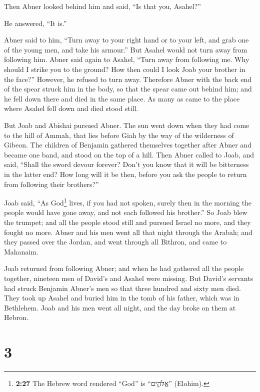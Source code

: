  Then Abner looked behind him and said, ``Is that you,
Asahel?''

He answered, ``It is.''

 Abner said to him, ``Turn away to your right hand or to
your left, and grab one of the young men, and take his armour.'' But
Asahel would not turn away from following him.  Abner
said again to Asahel, ``Turn away from following me. Why should I strike
you to the ground? How then could I look Joab your brother in the
face?''  However, he refused to turn away. Therefore
Abner with the back end of the spear struck him in the body, so that the
spear came out behind him; and he fell down there and died in the same
place. As many as came to the place where Asahel fell down and died
stood still.

 But Joab and Abishai pursued Abner. The sun went down
when they had come to the hill of Ammah, that lies before Giah by the
way of the wilderness of Gibeon.  The children of
Benjamin gathered themselves together after Abner and became one band,
and stood on the top of a hill.  Then Abner called to
Joab, and said, ``Shall the sword devour forever? Don't you know that it
will be bitterness in the latter end? How long will it be then, before
you ask the people to return from following their brothers?''

 Joab said, ``As God\footnote{\textbf{2:27} The Hebrew
  word rendered ``God'' is ``אֱלֹהִ֑ים'' (Elohim).} lives, if you had
not spoken, surely then in the morning the people would have gone away,
and not each followed his brother.''  So Joab blew the
trumpet; and all the people stood still and pursued Israel no more, and
they fought no more.  Abner and his men went all that
night through the Arabah; and they passed over the Jordan, and went
through all Bithron, and came to Mahanaim.

 Joab returned from following Abner; and when he had
gathered all the people together, nineteen men of David's and Asahel
were missing.  But David's servants had struck Benjamin
Abner's men so that three hundred and sixty men died. 
They took up Asahel and buried him in the tomb of his father, which was
in Bethlehem. Joab and his men went all night, and the day broke on them
at Hebron.

\hypertarget{section-2}{%
\section{3}\label{section-2}}

